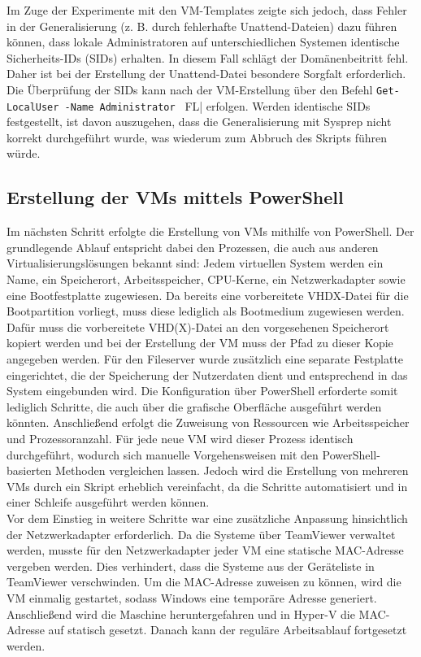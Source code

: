 \documentclass[a4paper,12pt]{article}
\begin{document}
Im Zuge der Experimente mit den VM-Templates zeigte sich jedoch, dass Fehler in der Generalisierung (z. B. durch fehlerhafte Unattend-Dateien) dazu führen können, dass lokale Administratoren auf unterschiedlichen Systemen identische Sicherheits-IDs (SIDs) erhalten. 
In diesem Fall schlägt der Domänenbeitritt fehl. Daher ist bei der Erstellung der Unattend-Datei besondere Sorgfalt erforderlich. 
Die Überprüfung der SIDs kann nach der VM-Erstellung über den Befehl \lstinline|Get-LocalUser -Name Administrator | FL| erfolgen. 
Werden identische SIDs festgestellt, ist davon auszugehen, dass die Generalisierung mit Sysprep nicht korrekt durchgeführt wurde, was wiederum zum Abbruch des Skripts führen würde.


\subsection{Erstellung der VMs mittels PowerShell}

Im nächsten Schritt erfolgte die Erstellung von VMs mithilfe von PowerShell.
Der grundlegende Ablauf entspricht dabei den Prozessen, die auch aus anderen Virtualisierungslösungen bekannt sind:
Jedem virtuellen System werden ein Name, ein Speicherort, Arbeitsspeicher, CPU-Kerne, ein Netzwerkadapter sowie eine Bootfestplatte zugewiesen.
Da bereits eine vorbereitete VHDX-Datei für die Bootpartition vorliegt, muss diese lediglich als Bootmedium zugewiesen werden.
Dafür muss die vorbereitete VHD(X)-Datei an den vorgesehenen Speicherort kopiert werden und bei der Erstellung der VM muss der Pfad zu dieser Kopie angegeben werden.
Für den Fileserver wurde zusätzlich eine separate Festplatte eingerichtet, die der Speicherung der Nutzerdaten dient und entsprechend in das System eingebunden wird.
Die Konfiguration über PowerShell erforderte somit lediglich Schritte, die auch über die grafische Oberfläche ausgeführt werden könnten.
Anschlie\ss end erfolgt die Zuweisung von Ressourcen wie Arbeitsspeicher und Prozessoranzahl.
Für jede neue VM wird dieser Prozess identisch durchgeführt, wodurch sich manuelle Vorgehensweisen mit den PowerShell-basierten Methoden vergleichen lassen.
Jedoch wird die Erstellung von mehreren VMs durch ein Skript erheblich vereinfacht, da die Schritte automatisiert und in einer Schleife ausgeführt werden können.\\

Vor dem Einstieg in weitere Schritte war eine zusätzliche Anpassung hinsichtlich der Netzwerkadapter erforderlich.
Da die Systeme über TeamViewer verwaltet werden, musste für den Netzwerkadapter jeder VM eine statische MAC-Adresse vergeben werden.
Dies verhindert, dass die Systeme aus der Geräteliste in TeamViewer verschwinden.
Um die MAC-Adresse zuweisen zu können, wird die VM einmalig gestartet, sodass Windows eine temporäre Adresse generiert.
Anschlie\ss end wird die Maschine heruntergefahren und in Hyper-V die MAC-Adresse auf statisch gesetzt.
Danach kann der reguläre Arbeitsablauf fortgesetzt werden.
\end{document}
